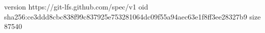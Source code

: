 version https://git-lfs.github.com/spec/v1
oid sha256:ce3ddd8cbc838f99c837925e753281064dc09f55a94aec63e1f8ff3ee28327b9
size 87540
